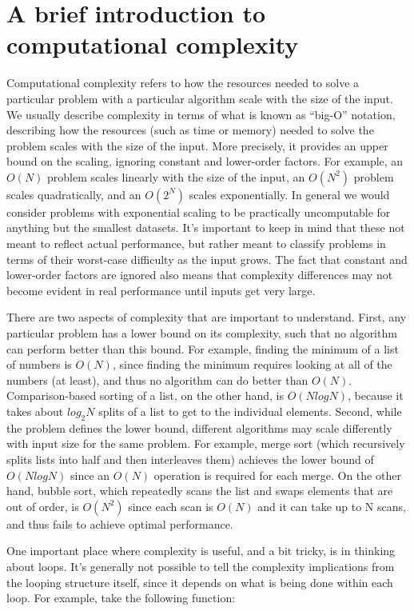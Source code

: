 \section{A brief introduction to computational complexity}

Computational complexity refers to how the resources needed to solve a particular problem with a particular algorithm scale with the size of the input. We usually describe complexity in terms of what is known as ``big-O'' notation, describing how the resources (such as time or memory) needed to solve the problem scales with the size of the input.  More precisely, it provides an upper bound on the scaling, ignoring constant and lower-order factors.  For example, an $O(N)$ problem scales linearly with the size of the input, an $O(N^2)$ problem scales quadratically, and an $O(2^N)$ scales exponentially. In general we would consider problems with exponential scaling to be practically uncomputable for anything but the smallest datasets. It's important to keep in mind that these not meant to reflect actual performance, but rather meant to classify problems in terms of their worst-case difficulty as the input grows.  The fact that constant and lower-order factors are ignored also means that complexity differences may not become evident in real performance until inputs get very large.

There are two aspects of complexity that are important to understand.  First, any particular problem has a lower bound on its complexity, such that no algorithm can perform better than this bound.  For example, finding the minimum of a list of numbers is $O(N)$, since finding the minimum requires looking at all of the numbers (at least), and thus no algorithm can do better than $O(N)$. Comparison-based sorting of a list, on the other hand, is $O(N log N)$, because it takes about $log_2 N$ splits of a list to get to the individual elements.  Second, while the problem defines the lower bound, different algorithms may scale differently with input size for the same problem.  For example, merge sort (which recursively splits lists into half and then interleaves them) achieves the lower bound of $O(N log N)$ since an $O(N)$ operation is required for each merge.  On the other hand, bubble sort, which repeatedly scans the list and swaps elements that are out of order, is $O(N^2)$ since each scan is $O(N)$ and it can take up to N scans, and thus fails to achieve optimal performance.

One important place where complexity is useful, and a bit tricky, is in thinking about loops. It's generally not possible to tell the complexity implications from the looping structure itself, since it depends on what is being done within each loop. For example, take the following function:

